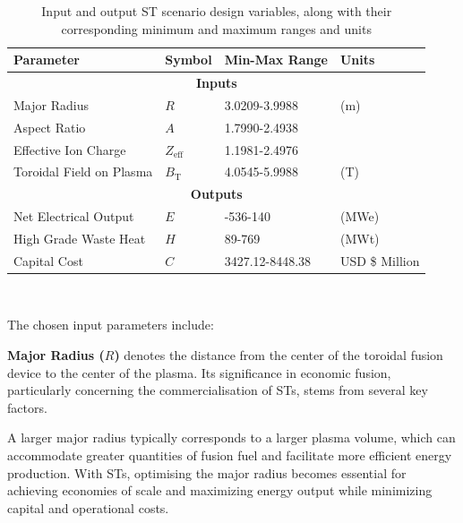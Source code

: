 \documentclass[journal]{IEEEtran}
\begin{document}
\begin{table}[]
    \begin{tabular}{@{}llll@{}}
    \toprule
    \textbf{Parameter}       & \textbf{Symbol} & \textbf{Min-Max Range} & \textbf{Units} \\ \midrule
    \multicolumn{4}{c}{\textbf{Inputs}}                                                    \\ \midrule
    Major Radius             & $R$               & 3.0209-3.9988          & (m)            \\
    Aspect Ratio             & $A$               & 1.7990-2.4938          &                \\
    Effective Ion Charge     & $Z_{\text{eff}}$  & 1.1981-2.4976          &                \\
    Toroidal Field on Plasma & $B_{\text{T}}$    & 4.0545-5.9988          & (T)            \\ \midrule
    \multicolumn{4}{c}{\textbf{Outputs}}                                                   \\ \midrule
    Net Electrical Output    & $E$               & -536-140               & (MWe)          \\
    High Grade Waste Heat    & $H$               & 89-769                 & (MWt)           \\
    Capital Cost             & $C$               & 3427.12-8448.38        & USD \$ Million \\ \bottomrule
    \end{tabular}
    \caption{Input and output ST scenario design variables, along with their corresponding minimum and maximum ranges and units}~\label{tab:params}
    \end{table}

The chosen input parameters include: 

\textbf{Major Radius ($R$)} denotes the distance from the center of the toroidal fusion device to the center of the plasma. Its significance in economic fusion, particularly concerning the commercialisation of STs, stems from several key factors.

A larger major radius typically corresponds to a larger plasma volume, which can accommodate greater quantities of fusion fuel and facilitate more efficient energy production. With STs, optimising the major radius becomes essential for achieving economies of scale and maximizing energy output while minimizing capital and operational costs.
\end{document}
